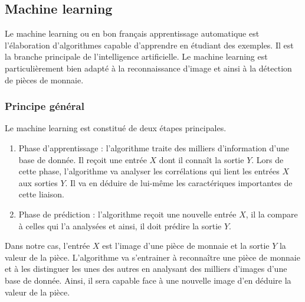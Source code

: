 \subsection{Machine learning}
Le machine learning ou en bon français apprentissage automatique est l'élaboration d'algorithmes capable d'apprendre en étudiant des exemples. Il est la branche principale de l'intelligence artificielle. Le machine learning est particulièrement bien adapté à la reconnaissance d'image et ainsi à la détection de pièces de monnaie. 
\subsubsection{Principe général}
Le machine learning est constitué de deux étapes principales.
\begin{enumerate}
\item Phase d'apprentissage : l'algorithme traite des milliers d'information d'une base de donnée. Il reçoit une entrée $X$ dont il connaît la sortie $Y$. Lors de cette phase, l'algorithme va analyser les corrélations qui lient les entrées $X$ aux sorties $Y$. Il va en déduire de lui-même les caractériques importantes de cette liaison.
\item Phase de prédiction : l'algorithme reçoit une nouvelle entrée $X$, il la compare à celles qui l'a analysées et ainsi, il doit prédire la sortie $Y$. 
\end{enumerate}
Dans notre cas, l'entrée $X$ est l'image d'une pièce de monnaie et la sortie $Y$ la valeur de la pièce. L'algorithme va s'entrainer à reconnaître une pièce de monnaie et à les distinguer les unes des autres en analysant des milliers d'images d'une base de donnée. Ainsi, il sera capable face à une nouvelle image d'en déduire la valeur de la pièce. 
